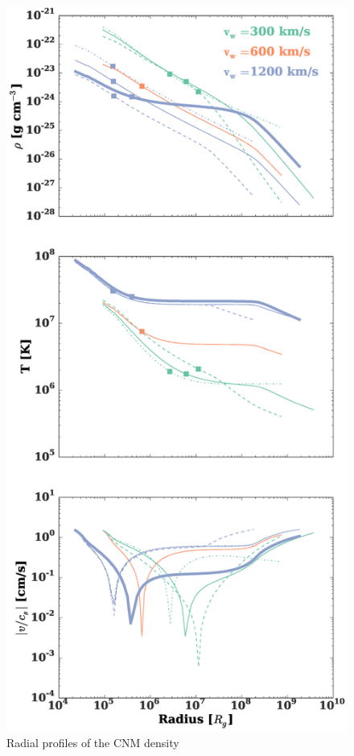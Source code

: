 \documentclass[usenatbib,fleqn]{mn2e}
\begin{document}
\begin{figure}
  \includegraphics[width=\columnwidth]{profiles.eps}
  \caption{\label{fig:profiles}Radial profiles of the CNM density
}
\end{figure}
\end{document}
